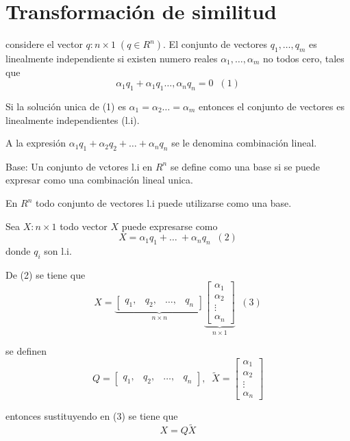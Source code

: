 \section{Transformación de similitud}
considere el vector \(q:n\times1\;(q\in R^n)\). El conjunto de vectores \(q_{1}, \ldots, q_{m}\) es linealmente independiente si existen numero reales \(\alpha_{1}, \ldots, \alpha_{m}\) no todos cero, tales que
\[
    \alpha_{1}q_{1} + \alpha_{1}q_{1} \ldots, \alpha_{n}q_{n}=0 \;\; (1)
\]

Si la solución unica de (1) es \(\alpha_{1}=\alpha_{2} \ldots =\alpha_{m}\) entonces el conjunto de vectores es linealmente independientes (l.i).

A la expresión \(\alpha_{1}q_{1}+\alpha_{2}q_{2}+ \ldots +\alpha_{n}q_{n}\) se le denomina combinación lineal.

Base: Un conjunto de vctores l.i en \(R^n\) se define como una base si se puede expresar como una combinación lineal unica.

En \(R^n\) todo conjunto de vectores l.i puede utilizarse como una base.

Sea \(X:n\times1\) todo vector \(X\) puede expresarse como 
\[
    X=\alpha_{1}q_{1}+ \ldots\ +\alpha_{n}q_{n}\;\; (2)
\] 
donde \(q_{i}\) son l.i.

De (2) se tiene que
\[
    X=
    \underbrace{
        \begin{bmatrix}
            q_{1},& q_{2},& \ldots,& q_{n}
        \end{bmatrix}
                }_{n\times n}
    \underbrace{
        \begin{bmatrix}
            \alpha_{1}\\
            \alpha_{2}\\
            \vdots\\
            \alpha_{n}
        \end{bmatrix}
                }_{n\times 1}\;\;(3)
\]

se definen
\[
    Q=
    \begin{bmatrix}
        q_{1},& q_{2},& \ldots,& q_{n}
    \end{bmatrix},\;\;
    \tilde{X}=
    \begin{bmatrix}
        \alpha_{1}\\
        \alpha_{2}\\
        \vdots\\
        \alpha_{n}
    \end{bmatrix}
\]

entonces sustituyendo en (3) se tiene que
\[
    X=Q\tilde{X}
\]

